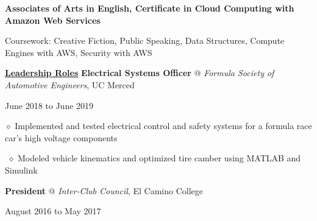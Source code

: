 \documentclass [11pt]{article}
\begin{document}
\begin{flushleft}
\textbf{Associates of Arts in English, Certificate in Cloud Computing with Amazon Web Services}

\raggedright
\quad\quad\quad Coursework: Creative Fiction, Public Speaking, Data Structures, Compute Engines with AWS, Security with AWS
\normalsize

\linebreak
\raggedright

\vspace{7}
\underline{\textbf{Leadership Roles}}
\linebreak
\textbf{Electrical Systems Officer} @ \emph{Formula Society of Automotive Engineers}, UC Merced \begin{minipage}{0.300 \linewidth}\begin{flushright}June 2018 to June 2019\end{flushright}\end{minipage}

‭‭\quad\quad\quad$\diamond$ Implemented and tested electrical control and safety systems for a formula race car’s high voltage components

‭‭%
\quad\quad\quad$\diamond$ Modeled vehicle kinematics and optimized tire camber using MATLAB and Simulink

\linebreak
\textbf{President} @ \emph{Inter-Club Council}, El Camino College \begin{minipage}{0.565 \linewidth}\begin{flushright}August 2016 to May 2017\end{flushright}\end{minipage}


\end{flushleft}
\end{document}

